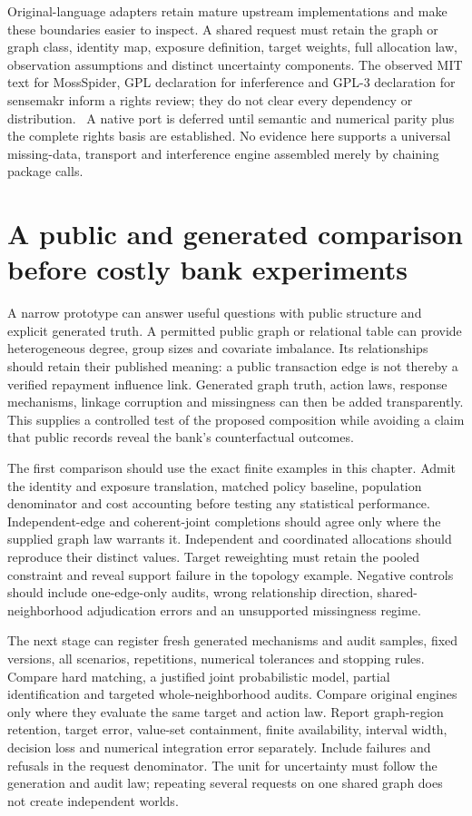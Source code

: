 Original-language adapters retain mature upstream implementations and make
these boundaries easier to inspect. A shared request must retain the graph
or graph class, identity map, exposure definition, target weights, full
allocation law, observation assumptions and distinct uncertainty components.
The observed MIT text for MossSpider, GPL declaration for inferference and
GPL-3 declaration for sensemakr inform a rights review; they do not clear
every dependency or distribution.~\citep{exec17_s7_paths} A native port is
deferred until semantic and numerical parity plus the complete rights basis
are established. No evidence here supports a universal missing-data,
transport and interference engine assembled merely by chaining package calls.

\section{A public and generated comparison before costly bank experiments}
\label{exec17:s7-prototype}

A narrow prototype can answer useful questions with public structure and
explicit generated truth. A permitted public graph or relational table can
provide heterogeneous degree, group sizes and covariate imbalance. Its
relationships should retain their published meaning: a public transaction
edge is not thereby a verified repayment influence link. Generated graph
truth, action laws, response mechanisms, linkage corruption and missingness
can then be added transparently. This supplies a controlled test of the
proposed composition while avoiding a claim that public records reveal the
bank's counterfactual outcomes.~\citep{exec17_s7_design}

The first comparison should use the exact finite examples in this chapter.
Admit the identity and exposure translation, matched policy baseline,
population denominator and cost accounting before testing any statistical
performance. Independent-edge and coherent-joint completions should agree
only where the supplied graph law warrants it. Independent and coordinated
allocations should reproduce their distinct values. Target reweighting must
retain the pooled constraint and reveal support failure in the topology
example. Negative controls should include one-edge-only audits, wrong
relationship direction, shared-neighborhood adjudication errors and an
unsupported missingness regime.

The next stage can register fresh generated mechanisms and audit samples,
fixed versions, all scenarios, repetitions, numerical tolerances and stopping
rules. Compare hard matching, a justified joint probabilistic model, partial
identification and targeted whole-neighborhood audits. Compare original
engines only where they evaluate the same target and action law. Report
graph-region retention, target error, value-set containment, finite
availability, interval width, decision loss and numerical integration error
separately. Include failures and refusals in the request denominator. The
unit for uncertainty must follow the generation and audit law; repeating
several requests on one shared graph does not create independent worlds.

